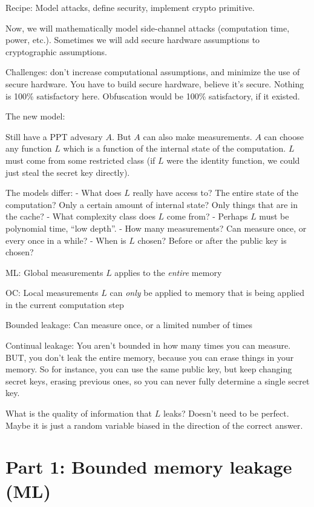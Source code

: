 \documentclass[10pt]{article}
\begin{document}
Recipe: Model attacks, define security, implement crypto primitive.

Now, we will mathematically model side-channel attacks (computation time, power, etc.). Sometimes we will add secure hardware assumptions to cryptographic assumptions.

Challenges: don't increase computational assumptions, and minimize the use of secure hardware. You have to build secure hardware, believe it's secure. Nothing is 100\% satisfactory here. Obfuscation would be 100\% satisfactory, if it existed.

The new model:

Still have a PPT advesary $A$. But $A$ can also make measurements. $A$ can choose any function $L$ which is a function of the internal state of the computation. $L$ must come from some restricted class (if $L$ were the identity function, we could just steal the secret key directly).

The models differ:
- What does $L$ really have access to? The entire state of the computation? Only a certain amount of internal state? Only things that are in the cache?
- What complexity class does $L$ come from?
- Perhaps $L$ must be polynomial time, ``low depth''.
- How many measurements? Can measure once, or every once in a while?
- When is $L$ chosen? Before or after the public key is chosen?

ML: Global measurements
$L$ applies to the \emph{entire} memory

OC: Local measurements
$L$ can \emph{only} be applied to memory that is being applied in the current computation step

Bounded leakage: Can measure once, or a limited number of times

Continual leakage: You aren't bounded in how many times you can measure. BUT, you don't leak the entire memory, because you can erase things in your memory. So for instance, you can use the same public key, but keep changing secret keys, erasing previous ones, so you can never fully determine a single secret key.

What is the quality of information that $L$ leaks? Doesn't need to be perfect. Maybe it is just a random variable biased in the direction of the correct answer.

\section{Part 1: Bounded memory leakage (ML)}
\end{document}
